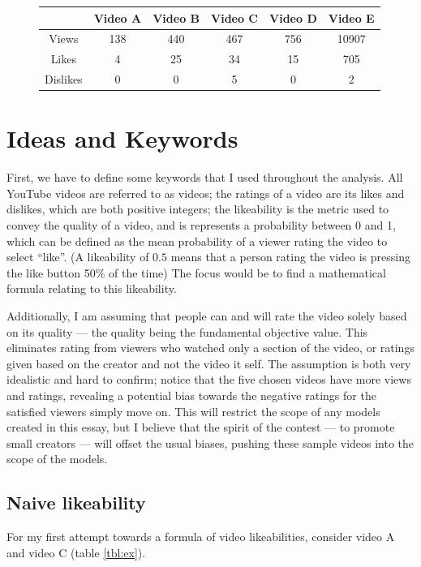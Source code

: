 \documentclass[a4paper,11pt]{article}
\begin{document}
\begin{figure}[H]
    \centering
    \begin{tabular}{c|c|c|c|c|c}
        & Video A & Video B & Video C & Video D & Video E \\
        \hline
        \hline
        Views & 138 & 440 & 467 & 756 & 10907 \\
        \hline
        Likes & 4 & 25 & 34 & 15 & 705 \\
        \hline
        Dislikes & 0 & 0 & 5 & 0 & 2
    \end{tabular}
    \label{tbl:videos}
\end{figure}


\section{Ideas and Keywords}
First, we have to define some keywords that I used throughout the analysis. All YouTube videos are referred to as videos; the ratings of a video are its likes and dislikes, which are both positive integers; the likeability is the metric used to convey the quality of a video, and is represents a probability between 0 and 1, which can be defined as the mean probability of a viewer rating the video to select ``like''. (A likeability of $0.5$ means that a person rating the video is pressing the like button 50\% of the time) The focus would be to find a mathematical formula relating to this likeability.

Additionally, I am assuming that people can and will rate the video solely based on its quality --- the quality being the fundamental objective value. This eliminates rating from viewers who watched only a section of the video, or ratings given based on the creator and not the video it self. The assumption is both very idealistic and hard to confirm; notice that the five chosen videos have more views and ratings, revealing a potential bias towards the negative ratings for the satisfied viewers simply move on. This will restrict the scope of any models created in this essay, but I believe that the spirit of the contest --- to promote small creators --- will offset the usual biases, pushing these sample videos into the scope of the models.

\subsection{Naive likeability}
For my first attempt towards a formula of video likeabilities, consider video A and video C (table \ref{tbl:ex}).
\end{document}
